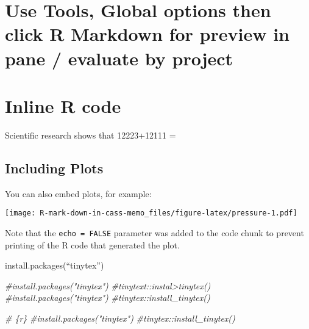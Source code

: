 \documentclass[
]{article}
\newenvironment{Shaded}{\begin{snugshade}}{\end{snugshade}}
\newcommand{\CommentTok}[1]{\textcolor[rgb]{0.56,0.35,0.01}{\textit{#1}}}
\begin{document}
\hypertarget{use-tools-global-options-then-click-r-markdown-for-preview-in-pane-evaluate-by-project}{%
\section{Use Tools, Global options then click R Markdown for preview in
pane / evaluate by
project}\label{use-tools-global-options-then-click-r-markdown-for-preview-in-pane-evaluate-by-project}}

\hypertarget{inline-r-code}{%
\section{Inline R code}\label{inline-r-code}}

Scientific research shows that 12223+12111 =

\hypertarget{including-plots}{%
\subsection{Including Plots}\label{including-plots}}

You can also embed plots, for example:

\texttt{[image: R-mark-down-in-cass-memo\_files/figure-latex/pressure-1.pdf]}

Note that the \texttt{echo\ =\ FALSE} parameter was added to the code
chunk to prevent printing of the R code that generated the plot.

install.packages(``tinytex'')

\begin{Shaded}
\begin{Highlighting}[]
\CommentTok{\#install.packages("tinytex")}
\CommentTok{\#tinytext::instal\textgreater{}tinytex()}
\CommentTok{\#\textasciigrave{}\textasciigrave{}\textasciigrave{}install.packages("tinytex")}
\CommentTok{\#tinytex::install\_tinytex()}


\CommentTok{\# \textasciigrave{}\textasciigrave{}\textasciigrave{}\{r\}}
\CommentTok{\#install.packages("tinytex")}
\CommentTok{\#tinytex::install\_tinytex()}
\end{Highlighting}
\end{Shaded}
\end{document}
